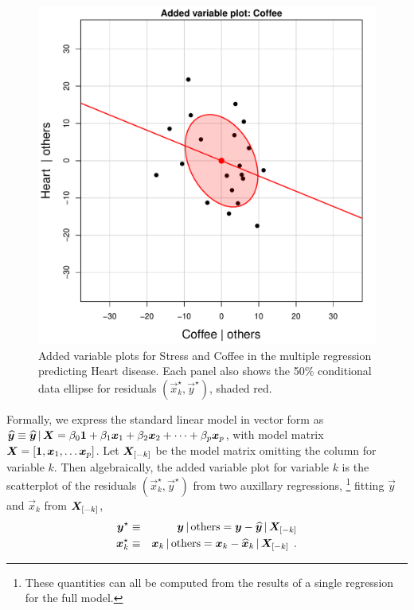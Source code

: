 \begin{figure}[htb]
\begin{minipage}[b]{.49\linewidth}
  \includegraphics[width=1\linewidth]{fig/coffee-avplot2}
 \end{minipage}
  \caption{Added variable plots for Stress and Coffee in the multiple regression predicting Heart disease.
Each panel also shows the 50\% conditional data ellipse for residuals $(\vec{x}_k^\star, \vec{y}^\star)$, shaded red.
}
  \label{fig:coffee-avplot-A}
\end{figure}

Formally, we express the standard linear model in vector form as
$\widehat{\bm{y}} \equiv \widehat{\bm{y}} \, | \, \bm{X} = \beta_0 \bm{1} + \beta_1 \bm{x}_1 + \beta_2 \bm{x}_2 + \dots +  \beta_p \bm{x}_p$,
with model matrix $\mat{X} = [ \vec{1}, \vec{x}_1, \dots \vec{x}_p ]$.
Let $\bm{X}_{[-k]}$ be the model matrix omitting the column for variable $k$.
Then algebraically, the added variable plot for variable $k$ is the scatterplot of the residuals $(\vec{x}^\star_k, \vec{y}^\star)$ from
two auxillary regressions,%
\footnote{
These quantities can all be computed \citep{VellemanWelsh:81} from the results of a 
single regression for the full model.
}
fitting $\vec{y}$ and $\vec{x}_k$ from $\bm{X}_{[-k]}$,
\begin{eqnarray*}
 \bm{y}^\star   & \equiv & \bm{y} \, | \, \textrm{others}  =  \bm{y} - \widehat{\bm{y}} \, | \, \bm{X}_{[-k]} \\
 \bm{x}^\star_k & \equiv & \bm{x}_k \, | \, \textrm{others}  =  \bm{x}_k - \widehat{\bm{x}}_k \, | \, \bm{X}_{[-k]}  \:\: . \\
\end{eqnarray*}

